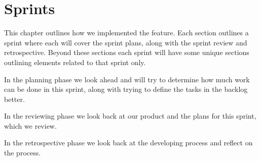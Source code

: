 \chapter{Sprints}

This chapter outlines how we implemented the feature. Each section outlines a sprint where each will cover the sprint plans, along with the sprint review and retrospective. Beyond these sections each sprint will have some unique sections outlining elements related to that sprint only.

In the planning phase we look ahead and will try to determine how much work can be done in this sprint, along with trying to define the tasks in the backlog better.

In the reviewing phase we look back at our product and the plans for this sprint, which we review.


In the retrospective phase we look back at the developing process and reflect on the process.







